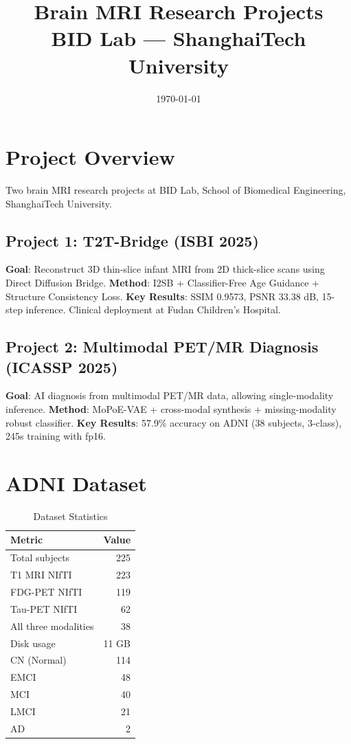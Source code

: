 \documentclass[11pt,a4paper]{article}
\title{\textbf{Brain MRI Research Projects}\\ \large BID Lab --- ShanghaiTech University}
\author{}
\date{\today}
\begin{document}
\maketitle

\section{Project Overview}
Two brain MRI research projects at BID Lab, School of Biomedical Engineering, ShanghaiTech University.

\subsection{Project 1: T2T-Bridge (ISBI 2025)}
\textbf{Goal}: Reconstruct 3D thin-slice infant MRI from 2D thick-slice scans using Direct Diffusion Bridge.
\textbf{Method}: I2SB + Classifier-Free Age Guidance + Structure Consistency Loss.
\textbf{Key Results}: SSIM 0.9573, PSNR 33.38 dB, 15-step inference. Clinical deployment at Fudan Children's Hospital.

\subsection{Project 2: Multimodal PET/MR Diagnosis (ICASSP 2025)}
\textbf{Goal}: AI diagnosis from multimodal PET/MR data, allowing single-modality inference.
\textbf{Method}: MoPoE-VAE + cross-modal synthesis + missing-modality robust classifier.
\textbf{Key Results}: 57.9\% accuracy on ADNI (38 subjects, 3-class), 245s training with fp16.

\section{ADNI Dataset}
\begin{table}[H]
\centering
\caption{Dataset Statistics}
\begin{tabular}{lr}
\toprule
\textbf{Metric} & \textbf{Value} \\
\midrule
Total subjects & 225 \\
T1 MRI NIfTI & 223 \\
FDG-PET NIfTI & 119 \\
Tau-PET NIfTI & 62 \\
All three modalities & 38 \\
Disk usage & 11 GB \\
\midrule
CN (Normal) & 114 \\
EMCI & 48 \\
MCI & 40 \\
LMCI & 21 \\
AD & 2 \\
\bottomrule
\end{tabular}
\end{table}
\end{document}
